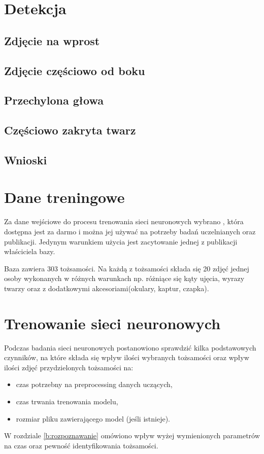 \section{Detekcja}
\subsection{Zdjęcie na wprost}
\subsection{Zdjęcie częściowo od boku}
\subsection{Przechylona głowa}
\subsection{Częściowo zakryta twarz}
\subsection{Wnioski}

\section{Dane treningowe}
Za dane wejściowe do procesu trenowania sieci neuronowych wybrano , która dostępna jest za darmo i można jej używać na potrzeby badań uczelnianych oraz publikacji. Jedynym warunkiem użycia jest zacytowanie jednej z publikacji właściciela bazy.

Baza zawiera 303 tożsamości. Na każdą z tożsamości składa się 20 zdjęć jednej osoby wykonanych w różnych warunkach np. różniące się kąty ujęcia, wyrazy twarzy oraz z dodatkowymi akcesoriami(okulary, kaptur, czapka). 

\section{Trenowanie sieci neuronowych}
Podczas badania sieci neuronowych postanowiono sprawdzić kilka podstawowych czynników, na które składa się wpływ ilości wybranych tożsamości oraz wpływ ilości zdjęć przydzielonych tożsamości na:
\begin{itemize}
\item czas potrzebny na preprocessing danych uczących,
\item czas trwania trenowania modelu,
\item rozmiar pliku zawierającego model (jeśli istnieje).
\end{itemize}
W rozdziale \ref{b:rozpoznawanie} omówiono wpływ wyżej wymienionych parametrów na czas oraz pewność identyfikowania tożsamości.

